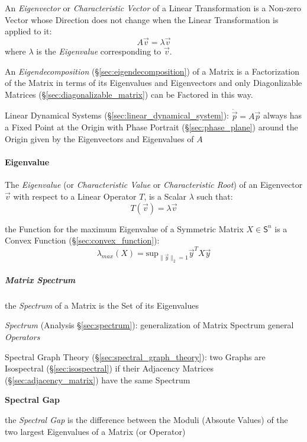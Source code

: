 An \emph{Eigenvector} or \emph{Characteristic Vector} of a Linear
Transformation is a Non-zero Vector whose Direction does not change when the
Linear Transformation is applied to it:
\[
  A\vec{v} = \lambda\vec{v}
\]
where $\lambda$ is the \emph{Eigenvalue} corresponding to $\vec{v}$.

An \emph{Eigendecomposition} (\S\ref{sec:eigendecomposition}) of a Matrix is a
Factorization of the Matrix in terms of its Eigenvalues and Eigenvectors and
only Diagonlizable Matrices (\S\ref{sec:diagonalizable_matrix}) can be Factored
in this way.

\fist Linear Dynamical Systems (\S\ref{sec:linear_dynamical_system}):
$\dot{\vec{p}} = A\vec{p}$ always has a Fixed Point at the Origin with Phase
Portrait (\S\ref{sec:phase_plane}) around the Origin given by the Eigenvectors
and Eigenvalues of $A$



\paragraph{Eigenvalue}\label{sec:eigenvalue}\hfill

The \emph{Eigenvalue} (or \emph{Characteristic Value} or \emph{Characteristic
  Root}) of an Eigenvector $\vec{v}$ with respect to a Linear Operator $T$, is a
Scalar $\lambda$ such that:
\[
  T(\vec{v}) = \lambda\vec{v}
\]

the Function for the maximum Eigenvalue of a Symmetric Matrix $X \in
\mathsf{S}^n$ is a Convex Function (\S\ref{sec:convex_function}):
\[
  \lambda_{max}(X) = \mathrm{sup}_{\|\vec{y}\|_2=1} \vec{y}^T X \vec{y}
\]



\subparagraph{Matrix Spectrum}\label{sec:matrix_spectrum}\hfill

the \emph{Spectrum} of a Matrix is the Set of its Eigenvalues

\fist \emph{Spectrum} (Analysis \S\ref{sec:spectrum}): generalization of Matrix
Spectrum general \emph{Operators}

\fist Spectral Graph Theory (\S\ref{sec:spectral_graph_theory}): two Graphs are
Isospectral (\S\ref{sec:isospectral}) if their Adjacency Matrices
(\S\ref{sec:adjacency_matrix}) have the same Spectrum


\textbf{Spectral Gap}

the \emph{Spectral Gap} is the difference between the Moduli (Absoute Values) of
the two largest Eigenvalues of a Matrix (or Operator)

